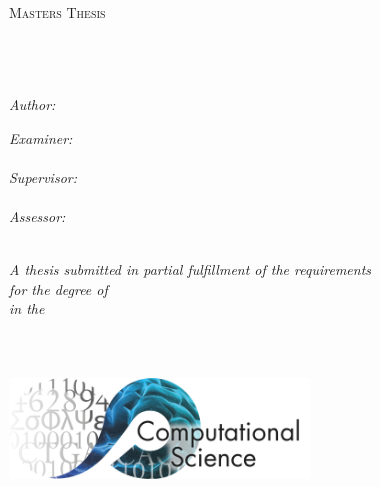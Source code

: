 \documentclass[11pt, oneside]{Thesis} %
\begin{document}
\begin{titlepage}
\begin{center}

\textsc{\LARGE \univname}\\[1.5cm] %
\textsc{\Large Masters Thesis}\\[0.5cm] %

\HRule \\[0.4cm] %
{\huge \bfseries \ttitle}\\[0.4cm] %
\HRule \\[1.5cm] %
 
\begin{minipage}{0.4\textwidth}
\begin{flushleft} \large
\emph{Author:}\\
\authornames %
\end{flushleft}
\end{minipage}
\begin{minipage}{0.4\textwidth}
\begin{flushright} \large
\emph{Examiner:} \\
{\exname}\\
\emph{Supervisor:} \\
{\supname}\\
\emph{Assessor:} \\
{\assessorname}
\end{flushright}
\end{minipage}\\[1cm]
 
\large \textit{A thesis submitted in partial fulfillment of the requirements\\ for the degree of \degreename}\\[0.3cm] %
\textit{in the}\\[0.4cm]
\groupname\\\deptname\\[1cm] %
 
{\large \todayy}\\[2cm] %
\includegraphics[width=0.6\textwidth]{clslogo.png} %
 
\vfill
\end{center}

\end{titlepage}
\end{document}
